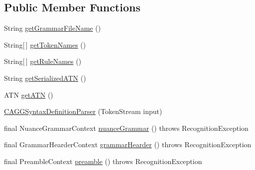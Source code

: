 \subsection*{Public Member Functions}
\begin{DoxyCompactItemize}
\item 
String \hyperlink{classit_1_1emarolab_1_1cagg_1_1core_1_1language_1_1parser_1_1ANTLRInterface_1_1ANTLRGenerated_1_1CAGGSyntaxDefinitionParser_a0044a79026064677c24a7178651f6282}{get\-Grammar\-File\-Name} ()
\item 
String\mbox{[}$\,$\mbox{]} \hyperlink{classit_1_1emarolab_1_1cagg_1_1core_1_1language_1_1parser_1_1ANTLRInterface_1_1ANTLRGenerated_1_1CAGGSyntaxDefinitionParser_ae88a311a4311576e28abfaba0c300cfd}{get\-Token\-Names} ()
\item 
String\mbox{[}$\,$\mbox{]} \hyperlink{classit_1_1emarolab_1_1cagg_1_1core_1_1language_1_1parser_1_1ANTLRInterface_1_1ANTLRGenerated_1_1CAGGSyntaxDefinitionParser_a4c1df70661a4f3fb9673acea08d96340}{get\-Rule\-Names} ()
\item 
String \hyperlink{classit_1_1emarolab_1_1cagg_1_1core_1_1language_1_1parser_1_1ANTLRInterface_1_1ANTLRGenerated_1_1CAGGSyntaxDefinitionParser_a71ec29dc36199d0c1782643fd7da64db}{get\-Serialized\-A\-T\-N} ()
\item 
A\-T\-N \hyperlink{classit_1_1emarolab_1_1cagg_1_1core_1_1language_1_1parser_1_1ANTLRInterface_1_1ANTLRGenerated_1_1CAGGSyntaxDefinitionParser_a526593863e0a48b9731c0dcddb89375e}{get\-A\-T\-N} ()
\item 
\hyperlink{classit_1_1emarolab_1_1cagg_1_1core_1_1language_1_1parser_1_1ANTLRInterface_1_1ANTLRGenerated_1_1CAGGSyntaxDefinitionParser_aaaa240ee9cfadd613a763f6373698ad2}{C\-A\-G\-G\-Syntax\-Definition\-Parser} (Token\-Stream input)
\item 
final Nuance\-Grammar\-Context \hyperlink{classit_1_1emarolab_1_1cagg_1_1core_1_1language_1_1parser_1_1ANTLRInterface_1_1ANTLRGenerated_1_1CAGGSyntaxDefinitionParser_acf2637a8bda445140296bb466a3ffb2a}{nuance\-Grammar} ()  throws Recognition\-Exception 
\item 
final Grammar\-Hearder\-Context \hyperlink{classit_1_1emarolab_1_1cagg_1_1core_1_1language_1_1parser_1_1ANTLRInterface_1_1ANTLRGenerated_1_1CAGGSyntaxDefinitionParser_a548b1479c2135f8d08525374bf56e3e7}{grammar\-Hearder} ()  throws Recognition\-Exception 
\item 
final Preamble\-Context \hyperlink{classit_1_1emarolab_1_1cagg_1_1core_1_1language_1_1parser_1_1ANTLRInterface_1_1ANTLRGenerated_1_1CAGGSyntaxDefinitionParser_a809aed72d5393705f342f42a5263603f}{preamble} ()  throws Recognition\-Exception 

\end{DoxyCompactItemize}
